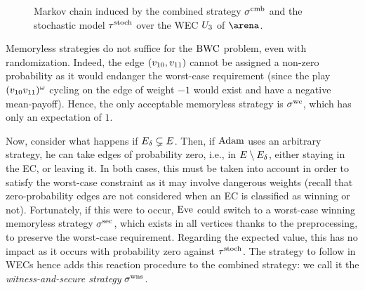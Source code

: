 \begin{example}
\begin{figure}[ht]
  \centering 
      \caption{Markov chain induced by the combined strategy $\sigma^{\text{cmb}}$ and the stochastic model $\tau^{\text{stoch}}$ over the WEC $U_{3}$ of $\arena$.}
\label{12-fig:mp_insideSWEC_MC}
\end{figure}
\end{example}

\begin{remark}
\label{12-rmk:bwcMemorylessNotEnough}
Memoryless strategies do not suffice for the $\text{BWC}$ problem, even with randomization. Indeed, the edge $(v_{10}, v_{11})$ cannot be assigned a non-zero probability as it would endanger the worst-case requirement (since the play~$(v_{10}v_{11})^{\omega}$ cycling on the edge of weight $-1$ would exist and have a negative mean-payoff). Hence, the only acceptable memoryless strategy is $\sigma^{\text{wc}}$, which has only an expectation of $1$.
\end{remark}


Now, consider what happens if $E_{\delta} \subsetneq E$. Then, if $\text{Adam}$ uses an arbitrary strategy, he can take edges of probability zero, i.e., in $E \setminus E_{\delta}$, either staying in the EC, or leaving it. In both cases, this must be taken into account in order to satisfy the worst-case constraint as it may involve dangerous weights (recall that zero-probability edges are not considered when an EC is classified as winning or not). Fortunately, if this were to occur, $\text{Eve}$ could switch to a worst-case winning memoryless strategy $\sigma^{\text{sec}}$, which exists in all vertices thanks to the preprocessing, to preserve the worst-case requirement. Regarding the expected value, this has no impact as it occurs with probability zero against $\tau^{\text{stoch}}$. The strategy to follow in WECs hence adds this reaction procedure to the combined strategy: we call it the \textit{witness-and-secure strategy} $\sigma^{\text{wns}}$.

